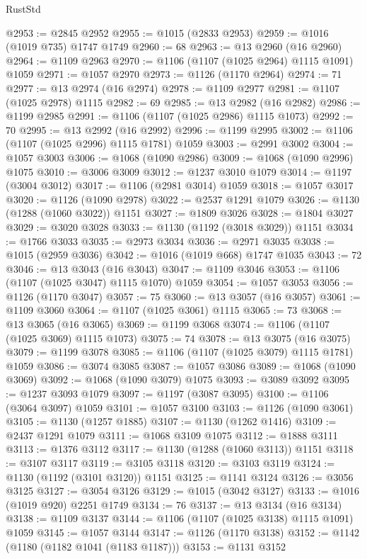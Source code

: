 \begin{lexlean}{RustStd}
\begin{coremodule}
@2953 := @2845 @2952
@2955 := @1015 (@2833 @2953)
@2959 := @1016 (@1019 @735) @1747 @1749
@2960 := 68
@2963 := @13 @2960 (@16 @2960)
@2964 := @1109 @2963
@2970 := @1106 (@1107 (@1025 @2964) @1115 @1091) @1059
@2971 := @1057 @2970
@2973 := @1126 (@1170 @2964)
@2974 := 71
@2977 := @13 @2974 (@16 @2974)
@2978 := @1109 @2977
@2981 := @1107 (@1025 @2978) @1115
@2982 := 69
@2985 := @13 @2982 (@16 @2982)
@2986 := @1199 @2985
@2991 := @1106 (@1107 (@1025 @2986) @1115 @1073)
@2992 := 70
@2995 := @13 @2992 (@16 @2992)
@2996 := @1199 @2995
@3002 := @1106 (@1107 (@1025 @2996) @1115 @1781) @1059
@3003 := @2991 @3002
@3004 := @1057 @3003
@3006 := @1068 (@1090 @2986)
@3009 := @1068 (@1090 @2996) @1075
@3010 := @3006 @3009
@3012 := @1237 @3010 @1079
@3014 := @1197 (@3004 @3012)
@3017 := @1106 (@2981 @3014) @1059
@3018 := @1057 @3017
@3020 := @1126 (@1090 @2978)
@3022 := @2537 @1291 @1079
@3026 := @1130 (@1288 (@1060 @3022)) @1151
@3027 := @1809 @3026
@3028 := @1804 @3027
@3029 := @3020 @3028
@3033 := @1130 (@1192 (@3018 @3029)) @1151
@3034 := @1766 @3033
@3035 := @2973 @3034
@3036 := @2971 @3035
@3038 := @1015 (@2959 @3036)
@3042 := @1016 (@1019 @668) @1747 @1035
@3043 := 72
@3046 := @13 @3043 (@16 @3043)
@3047 := @1109 @3046
@3053 := @1106 (@1107 (@1025 @3047) @1115 @1070) @1059
@3054 := @1057 @3053
@3056 := @1126 (@1170 @3047)
@3057 := 75
@3060 := @13 @3057 (@16 @3057)
@3061 := @1109 @3060
@3064 := @1107 (@1025 @3061) @1115
@3065 := 73
@3068 := @13 @3065 (@16 @3065)
@3069 := @1199 @3068
@3074 := @1106 (@1107 (@1025 @3069) @1115 @1073)
@3075 := 74
@3078 := @13 @3075 (@16 @3075)
@3079 := @1199 @3078
@3085 := @1106 (@1107 (@1025 @3079) @1115 @1781) @1059
@3086 := @3074 @3085
@3087 := @1057 @3086
@3089 := @1068 (@1090 @3069)
@3092 := @1068 (@1090 @3079) @1075
@3093 := @3089 @3092
@3095 := @1237 @3093 @1079
@3097 := @1197 (@3087 @3095)
@3100 := @1106 (@3064 @3097) @1059
@3101 := @1057 @3100
@3103 := @1126 (@1090 @3061)
@3105 := @1130 (@1257 @1885)
@3107 := @1130 (@1262 @1416)
@3109 := @2437 @1291 @1079
@3111 := @1068 @3109 @1075
@3112 := @1888 @3111
@3113 := @1376 @3112
@3117 := @1130 (@1288 (@1060 @3113)) @1151
@3118 := @3107 @3117
@3119 := @3105 @3118
@3120 := @3103 @3119
@3124 := @1130 (@1192 (@3101 @3120)) @1151
@3125 := @1141 @3124
@3126 := @3056 @3125
@3127 := @3054 @3126
@3129 := @1015 (@3042 @3127)
@3133 := @1016 (@1019 @920) @2251 @1749
@3134 := 76
@3137 := @13 @3134 (@16 @3134)
@3138 := @1109 @3137
@3144 := @1106 (@1107 (@1025 @3138) @1115 @1091) @1059
@3145 := @1057 @3144
@3147 := @1126 (@1170 @3138)
@3152 := @1142 (@1180 (@1182 @1041 (@1183 @1187)))
@3153 := @1131 @3152

\end{coremodule}
\end{lexlean}
